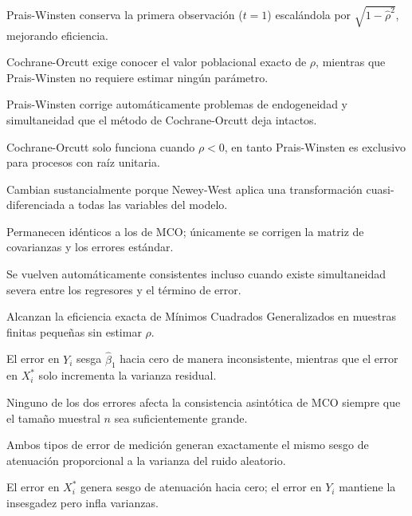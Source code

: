 \begin{opts}
    \item Prais-Winsten conserva la primera observación ($t=1$) escalándola por $\sqrt{1 - \hat{\rho}^2}$, mejorando eficiencia.
    \item Cochrane-Orcutt exige conocer el valor poblacional exacto de $\rho$, mientras que Prais-Winsten no requiere estimar ningún parámetro.
    \item Prais-Winsten corrige automáticamente problemas de endogeneidad y simultaneidad que el método de Cochrane-Orcutt deja intactos.
    \item Cochrane-Orcutt solo funciona cuando $\rho < 0$, en tanto Prais-Winsten es exclusivo para procesos con raíz unitaria.
\end{opts}

\begin{opts}
    \item Cambian sustancialmente porque Newey-West aplica una transformación cuasi-diferenciada a todas las variables del modelo.
    \item Permanecen idénticos a los de MCO; únicamente se corrigen la matriz de covarianzas y los errores estándar.
    \item Se vuelven automáticamente consistentes incluso cuando existe simultaneidad severa entre los regresores y el término de error.
    \item Alcanzan la eficiencia exacta de Mínimos Cuadrados Generalizados en muestras finitas pequeñas sin estimar $\rho$.
\end{opts}

\begin{opts}
    \item El error en $Y_i$ sesga $\hat{\beta}_1$ hacia cero de manera inconsistente, mientras que el error en $X_i^*$ solo incrementa la varianza residual.
    \item Ninguno de los dos errores afecta la consistencia asintótica de MCO siempre que el tamaño muestral $n$ sea suficientemente grande.
    \item Ambos tipos de error de medición generan exactamente el mismo sesgo de atenuación proporcional a la varianza del ruido aleatorio.
    \item El error en $X_i^*$ genera sesgo de atenuación hacia cero; el error en $Y_i$ mantiene la insesgadez pero infla varianzas.
\end{opts}

